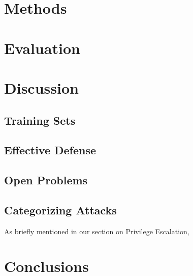 \documentclass{acm_proc_article-sp}
\begin{document}
\section{Methods}

\section{Evaluation}

\section{Discussion}
    \subsection{Training Sets}
    \subsection{Effective Defense}
    \subsection{Open Problems}
    \subsection{Categorizing Attacks} %
    	As briefly mentioned in our section on Privilege Escalation, 

\section{Conclusions}

	

{}  %
\nocite{*}
%
%
\balancecolumns
\end{document}
